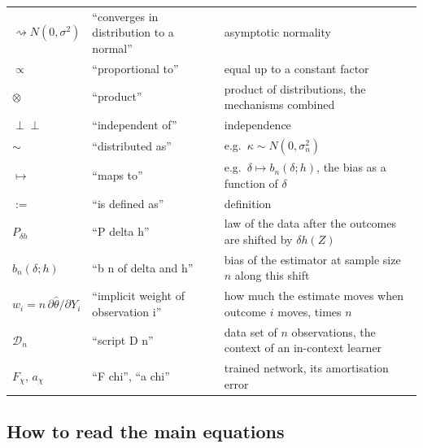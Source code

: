 \documentclass[11pt]{article}
\newcommand{\indep}{\perp\!\!\!\perp}
\begin{document}
\begin{longtable}{@{}l p{4cm} p{7.4cm}@{}}
$\rightsquigarrow N(0,\sigma^2)$ & ``converges in distribution to a normal'' & asymptotic normality\\
$\propto$ & ``proportional to'' & equal up to a constant factor\\
$\otimes$ & ``product'' & product of distributions, the mechanisms combined\\
$\indep$ & ``independent of'' & independence\\
$\sim$ & ``distributed as'' & e.g.\ $\kappa\sim N(0,\sigma_n^2)$\\
$\mapsto$ & ``maps to'' & e.g.\ $\delta\mapsto b_n(\delta;h)$, the bias as a function of $\delta$\\
$:=$ & ``is defined as'' & definition\\
$P_{\delta h}$ & ``P delta h'' & law of the data after the outcomes are shifted by $\delta h(Z)$\\
$b_n(\delta;h)$ & ``b n of delta and h'' & bias of the estimator at sample size $n$ along this shift\\
$w_i=n\,\partial\hat\theta/\partial Y_i$ & ``implicit weight of observation i'' & how much the estimate moves when outcome $i$ moves, times $n$\\
$\mathcal D_n$ & ``script D n'' & data set of $n$ observations, the context of an in-context learner\\
$F_\chi$, $a_\chi$ & ``F chi'', ``a chi'' & trained network, its amortisation error\\
\bottomrule
\end{longtable}

\subsection{How to read the main equations}
\end{document}
